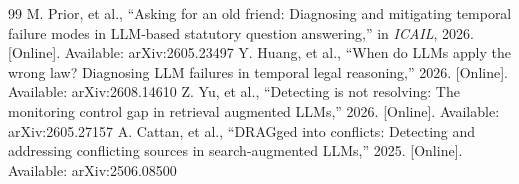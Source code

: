\documentclass[conference]{IEEEtran}
\begin{document}
\begin{thebibliography}{99}
 M. Prior, et al., ``Asking for an old friend: Diagnosing and mitigating temporal failure modes in LLM-based statutory question answering,'' in \emph{ICAIL}, 2026. [Online]. Available: arXiv:2605.23497
 Y. Huang, et al., ``When do LLMs apply the wrong law? Diagnosing LLM failures in temporal legal reasoning,'' 2026. [Online]. Available: arXiv:2608.14610
 Z. Yu, et al., ``Detecting is not resolving: The monitoring control gap in retrieval augmented LLMs,'' 2026. [Online]. Available: arXiv:2605.27157
 A. Cattan, et al., ``DRAGged into conflicts: Detecting and addressing conflicting sources in search-augmented LLMs,'' 2025. [Online]. Available: arXiv:2506.08500
\end{thebibliography}
\end{document}
